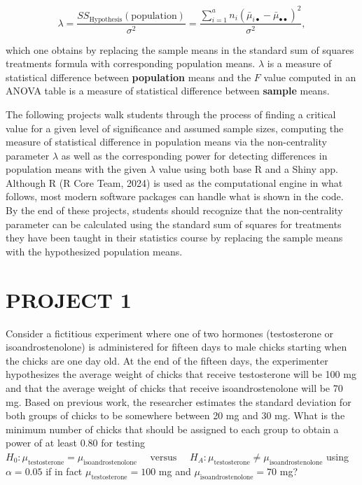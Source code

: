 \documentclass[
]{article}
\begin{document}
\begin{equation*}
\lambda = \frac{SS_\text{Hypothesis}(\text{population})}{\sigma^2} = \frac{\sum_{i=1}^{a}n_i(\bar{\mu}_{i\bullet} - \bar{\mu}_{\bullet\bullet})^2}{\sigma^2},
\end{equation*}

which one obtains by replacing the sample means in the standard sum of squares treatments formula with corresponding population means. \(\lambda\) is a measure of statistical difference between \textbf{population} means and the \(F\) value computed in an ANOVA table is a measure of statistical difference between \textbf{sample} means.

The following projects walk students through the process of finding a critical value for a given level of significance and assumed sample sizes, computing the measure of statistical difference in population means via the non-centrality parameter \(\lambda\) as well as the corresponding power for detecting differences in population means with the given \(\lambda\) value using both base R and a Shiny app. Although R (R Core Team, 2024) is used as the computational engine in what follows, most modern software packages can handle what is shown in the code. By the end of these projects, students should recognize that the non-centrality parameter can be calculated using the standard sum of squares for treatments they have been taught in their statistics course by replacing the sample means with the hypothesized population means.

\hypertarget{project-1}{%
\section*{PROJECT 1}\label{project-1}}

Consider a fictitious experiment where one of two hormones (testosterone or isoandrostenolone) is administered for fifteen days to male chicks starting when the chicks are one day old. At the end of the fifteen days, the experimenter hypothesizes the average weight of chicks that receive testosterone will be 100 mg and that the average weight of chicks that receive isoandrostenolone will be 70 mg. Based on previous work, the researcher estimates the standard deviation for both groups of chicks to be somewhere between 20 mg and 30 mg. What is the minimum number of chicks that should be assigned to each group to obtain a power of at least 0.80 for testing \(H_0: \mu_\text{testosterone} = \mu_\text{isoandrostenolone}\quad\text{ versus }\quad H_A: \mu_\text{testosterone} \neq \mu_\text{isoandrostenolone}\) using \(\alpha = 0.05\) if in fact \(\mu_\text{testosterone} = 100\) mg and \(\mu_\text{isoandrostenolone} = 70\) mg?
\end{document}
